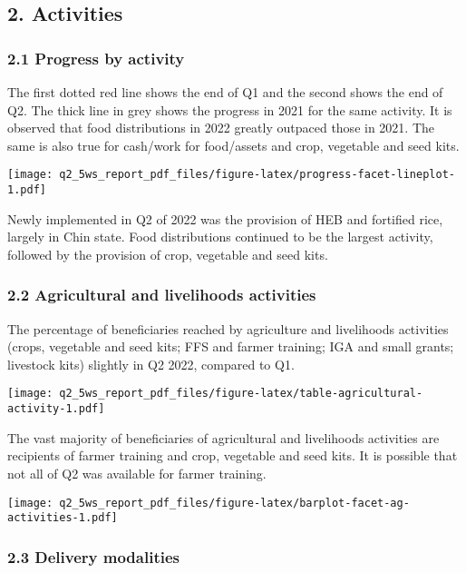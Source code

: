 \documentclass[
]{article}
\begin{document}
\hypertarget{activities}{%
\subsection{2. Activities}\label{activities}}

\hypertarget{progress-by-activity}{%
\subsubsection{2.1 Progress by activity}\label{progress-by-activity}}

The first dotted red line shows the end of Q1 and the second shows the
end of Q2. The thick line in grey shows the progress in 2021 for the
same activity. It is observed that food distributions in 2022 greatly
outpaced those in 2021. The same is also true for cash/work for
food/assets and crop, vegetable and seed kits.

\texttt{[image: q2\_5ws\_report\_pdf\_files/figure-latex/progress-facet-lineplot-1.pdf]}

Newly implemented in Q2 of 2022 was the provision of HEB and fortified
rice, largely in Chin state. Food distributions continued to be the
largest activity, followed by the provision of crop, vegetable and seed
kits.

\hypertarget{agricultural-and-livelihoods-activities}{%
\subsubsection{2.2 Agricultural and livelihoods
activities}\label{agricultural-and-livelihoods-activities}}

The percentage of beneficiaries reached by agriculture and livelihoods
activities (crops, vegetable and seed kits; FFS and farmer training; IGA
and small grants; livestock kits) slightly in Q2 2022, compared to Q1.

\texttt{[image: q2\_5ws\_report\_pdf\_files/figure-latex/table-agricultural-activity-1.pdf]}

The vast majority of beneficiaries of agricultural and livelihoods
activities are recipients of farmer training and crop, vegetable and
seed kits. It is possible that not all of Q2 was available for farmer
training.

\texttt{[image: q2\_5ws\_report\_pdf\_files/figure-latex/barplot-facet-ag-activities-1.pdf]}

\hypertarget{delivery-modalities}{%
\subsubsection{2.3 Delivery modalities}\label{delivery-modalities}}
\end{document}
